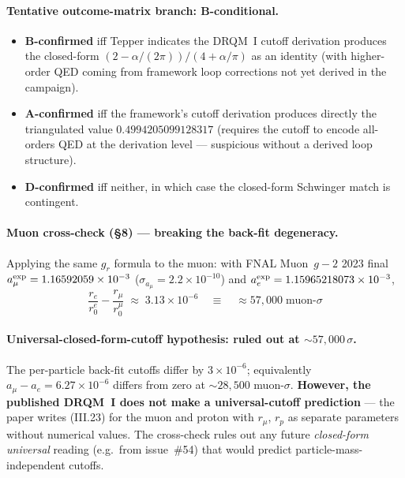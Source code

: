 \paragraph{Tentative outcome-matrix branch: B-conditional.}
\begin{itemize}[topsep=2pt,itemsep=0pt]
  \item \textbf{B-confirmed} iff Tepper indicates the DRQM~I cutoff derivation
        produces the closed-form $(2 - \alpha/(2\pi))/(4 + \alpha/\pi)$ as an
        identity (with higher-order QED coming from framework loop
        corrections not yet derived in the campaign).
  \item \textbf{A-confirmed} iff the framework's cutoff derivation produces
        directly the triangulated value $0.4994205099128317$ (requires the
        cutoff to encode all-orders QED at the derivation level --- suspicious
        without a derived loop structure).
  \item \textbf{D-confirmed} iff neither, in which case the closed-form
        Schwinger match is contingent.
\end{itemize}

\paragraph{Muon cross-check (\S8) --- breaking the back-fit degeneracy.}
Applying the same $g_r$ formula to the muon: with FNAL Muon~$g-2$ 2023 final
$a_\mu^{\rm exp} = 1.16592059\times 10^{-3}$
($\sigma_{a_\mu} = 2.2\times 10^{-10}$) and
$a_e^{\rm exp} = 1.15965218073\times 10^{-3}$,
\[
\frac{r_e}{r_0^e} - \frac{r_\mu}{r_0^\mu} \;\approx\; 3.13\times 10^{-6}
\quad\equiv\quad \approx 57{,}000\;\text{muon-}\sigma
\]

\paragraph{Universal-closed-form-cutoff hypothesis: ruled out at $\sim 57{,}000\,\sigma$.}
The per-particle back-fit cutoffs differ by $3\times 10^{-6}$; equivalently
$a_\mu - a_e = 6.27\times 10^{-6}$ differs from zero at $\sim 28{,}500$
muon-$\sigma$. \textbf{However, the published DRQM~I does not make a
universal-cutoff prediction} --- the paper writes (III.23) for the muon and
proton with $r_\mu$, $r_p$ as separate parameters without numerical values.
The cross-check rules out any future \emph{closed-form universal} reading
(e.g.~from issue~\#54) that would predict particle-mass-independent cutoffs.

